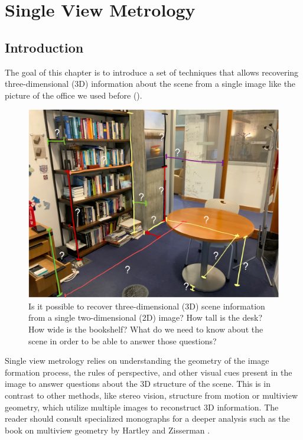 %
\chapter{Single View Metrology}
\label{chapter:3D_single_view}


\section{Introduction}

The goal of this chapter is to introduce a set of techniques that allows recovering three-dimensional (3D) information about the scene from a single image like the picture of the office we used before (\fig{\ref{fig:finding_depth_office}}).  

\begin{figure}[!h]
\centerline{
\includegraphics[width=.8\linewidth]{figures/single_view_3d/inverse_office_measurements.jpg}
}
\caption{Is it possible to recover three-dimensional (3D) scene information from a single two-dimensional (2D) image? How tall is the desk? How wide is the bookshelf? What do we need to know about the scene in order to be able to answer those questions?}
\label{fig:finding_depth_office}
\end{figure}



Single view metrology relies on understanding the geometry of the image formation process, the rules of perspective, and other visual cues present in the image to answer questions about the 3D structure of the scene. This is in contrast to other methods, like stereo vision, structure from motion or multiview geometry, which utilize multiple images to reconstruct 3D information. The reader should consult specialized monographs for a deeper analysis such as the book on multiview geometry by Hartley and Zisserman \cite{Hartley2004}. 

